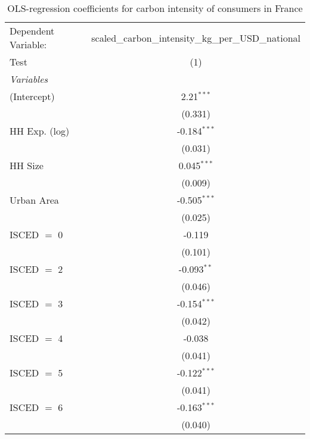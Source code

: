 
\begin{table}[htbp!]
   \centering
   \small
   \begin{adjustbox}{width = 1\textwidth, max height = 0.95\textheight, center}
      \begin{threeparttable}[b]
         \caption{\label{tab:OLS_1_FRA} OLS-regression coefficients for carbon intensity of consumers in France}
         \begin{tabular}{lc}
            \tabularnewline \midrule \midrule
            Dependent Variable: & scaled\_carbon\_intensity\_kg\_per\_USD\_national\\        
            Test                & (1)\\  
            \midrule
            \emph{Variables}\\
            (Intercept)         & 2.21$^{***}$\\   
                                & (0.331)\\   
            HH Exp. (log)       & -0.184$^{***}$\\   
                                & (0.031)\\   
            HH Size             & 0.045$^{***}$\\   
                                & (0.009)\\   
            Urban Area          & -0.505$^{***}$\\   
                                & (0.025)\\   
            ISCED $=$ 0         & -0.119\\   
                                & (0.101)\\   
            ISCED $=$ 2         & -0.093$^{**}$\\   
                                & (0.046)\\   
            ISCED $=$ 3         & -0.154$^{***}$\\   
                                & (0.042)\\   
            ISCED $=$ 4         & -0.038\\   
                                & (0.041)\\   
            ISCED $=$ 5         & -0.122$^{***}$\\   
                                & (0.041)\\   
            ISCED $=$ 6         & -0.163$^{***}$\\   
                                & (0.040)\\   

\end{tabular}
\end{threeparttable}
\end{adjustbox}
\end{table}
